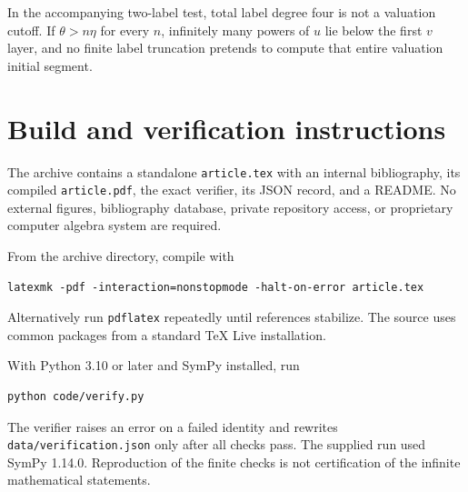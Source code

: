 \documentclass[11pt,letterpaper]{article}
\numberwithin{equation}{section}
\theoremstyle{definition}
\theoremstyle{remark}
\begin{document}
In the accompanying two-label test, total label degree four is not a
valuation cutoff. If $\theta>n\eta$ for every $n$, infinitely many powers of
$u$ lie below the first $v$ layer, and no finite label truncation pretends to
compute that entire valuation initial segment.

\section{Build and verification instructions}
The archive contains a standalone \texttt{article.tex} with an internal
bibliography, its compiled \texttt{article.pdf}, the exact verifier, its JSON
record, and a README. No external figures, bibliography database, private
repository access, or proprietary computer algebra system are required.

From the archive directory, compile with
\begin{verbatim}
latexmk -pdf -interaction=nonstopmode -halt-on-error article.tex
\end{verbatim}
Alternatively run \texttt{pdflatex} repeatedly until references stabilize.
The source uses common packages from a standard TeX Live installation.

With Python 3.10 or later and SymPy installed, run
\begin{verbatim}
python code/verify.py
\end{verbatim}
The verifier raises an error on a failed identity and rewrites
\texttt{data/verification.json} only after all checks pass. The supplied
run used SymPy 1.14.0. Reproduction of the finite checks is not certification
of the infinite mathematical statements.
\end{document}
